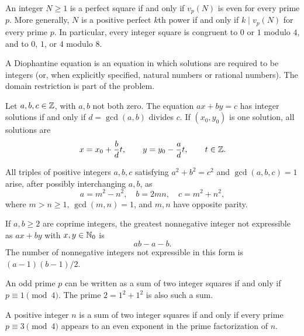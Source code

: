 \begin{proposition}
An integer $N\ge1$ is a perfect square if and only if $v_p(N)$ is even for every prime $p$. More generally, $N$ is a positive perfect $k$th power if and only if $k\mid v_p(N)$ for every prime $p$. In particular, every integer square is congruent to $0$ or $1$ modulo $4$, and to $0$, $1$, or $4$ modulo $8$.
\end{proposition}
\begin{definition}
A Diophantine equation is an equation in which solutions are required to be integers (or, when explicitly specified, natural numbers or rational numbers). The domain restriction is part of the problem.
\end{definition}

\begin{theorem}
Let $a, b, c\in\mathbb{Z}$, with $a, b$ not both zero. The equation $ax+by=c$ has integer solutions if and only if $d=\gcd(a, b)$ divides $c$. If $(x_0, y_0)$ is one solution, all solutions are
\[
 x=x_0+\frac bd t, \qquad y=y_0-\frac ad t,
 \qquad t\in\mathbb{Z}.
\]
\end{theorem}

\begin{theorem}
All triples of positive integers $a, b, c$ satisfying $a^2+b^2=c^2$ and $\gcd(a, b, c)=1$ arise, after possibly interchanging $a, b$, as
\[
 a=m^2-n^2, \quad b=2mn, \quad c=m^2+n^2,
\]
where $m>n\ge1$, $\gcd(m, n)=1$, and $m, n$ have opposite parity.
\end{theorem}

\begin{theorem}
If $a, b\ge2$ are coprime integers, the greatest nonnegative integer not expressible as $ax+by$ with $x, y\in\mathbb{N}_0$ is
\[
 ab-a-b.
\]
The number of nonnegative integers not expressible in this form is $(a-1)(b-1)/2$.
\end{theorem}

\begin{theorem}
An odd prime $p$ can be written as a sum of two integer squares if and only if $p\equiv1\pmod4$. The prime $2=1^2+1^2$ is also such a sum.
\end{theorem}

\begin{theorem}
A positive integer $n$ is a sum of two integer squares if and only if every prime $p\equiv3\pmod4$ appears to an even exponent in the prime factorization of $n$.
\end{theorem}


